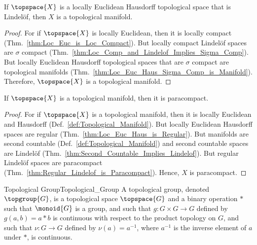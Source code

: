         \begin{theorem}
            \label{thm:Loc_Euc_Hausdorff_Lindelof_is_Manifold}%
            If $\topspace{X}$ is a locally Euclidean Hausdorff topological space
            that is Lindel\"{o}f, then $X$ is a topological manifold.
        \end{theorem}
        \begin{proof}
            For if $\topspace{X}$ is locally Euclidean, then it is locally
            compact (Thm.~\ref{thm:Loc_Euc_is_Loc_Compact}). But locally compact
            Lindel\"{o}f spaces are $\sigma$ compact
            (Thm.~\ref{thm:Loc_Comp_and_Lindelof_Implies_Sigma_Comp}). But
            locally Euclidean Hausdorff topological spaces that are $\sigma$
            compact are topological manifolds
            (Thm.~\ref{thm:Loc_Euc_Haus_Sigma_Comp_is_Manifold}). Therefore,
            $\topspace{X}$ is a topological manifold.
        \end{proof}
        \begin{theorem}
            \label{thm:Top_Man_is_Paracompact}%
            If $\topspace{X}$ is a topological manifold, then it is paracompact.
        \end{theorem}
        \begin{proof}
            For if $\topspace{X}$ is a topological manifold, then it is
            locally Euclidean and Hausdorff
            (Def.~\ref{def:Topological_Manifold}). But locally Euclidean
            Hausdorff spaces are regular
            (Thm.~\ref{thm:Loc_Euc_Haus_is_Regular}). But manifolds are
            second countable (Def.~\ref{def:Topological_Manifold}) and
            second countable spaces are Lindel\"{o}f
            (Thm.~\ref{thm:Second_Countable_Implies_Lindelof}). But
            regular Lindel\"{o}f spaces are paracompact
            (Thm.~\ref{thm:Regular_Lindelof_is_Paracompact}). Hence,
            $X$ is paracompact.
        \end{proof}
        \begin{fdefinition}{Topological Group}{Topological_Group}
            A topological group, denoted $\topgroup{G}$, is a topological space
            $\topspace{G}$ and a binary operation $*$ such that $\monoid{G}$ is
            a group, and such that $g:G\times{G}\rightarrow{G}$ defined by
            $g(a,b)=a*b$ is continuous with respect to the product topology on
            $G$, and such that $\nu:G\rightarrow{G}$ defined by
            $\nu(a)=a^{\minus{1}}$, where $a^{\minus{1}}$ is the inverse element
            of $a$ under $*$, is continuous.
        \end{fdefinition}
